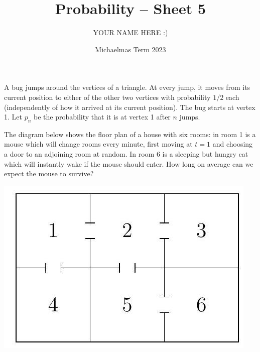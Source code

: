 \documentclass[answers]{exam}
\title{Probability -- Sheet 5}
\author{YOUR NAME HERE :)}
\date{Michaelmas Term 2023}
\begin{document}
\maketitle
\begin{questions}

\question%
A bug jumps around the vertices of a triangle. At every jump, it moves from its current position to either of the other two vertices with probability $1 / 2$ each (independently of how it arrived at its current position). The bug starts at vertex 1. Let $p_{n}$ be the probability that it is at vertex 1 after $n$ jumps.



\question%
The diagram below shows the floor plan of a house with six rooms: in room 1 is a mouse which will change rooms every minute, first moving at $t=1$ and choosing a door to an adjoining room at random. In room 6 is a sleeping but hungry cat which will instantly wake if the mouse should enter. How long on average can we expect the mouse to survive?
\begin{center}\includegraphics[scale=0.3]{sheet 5 diagram}\end{center}%




\end{questions}
\end{document}

